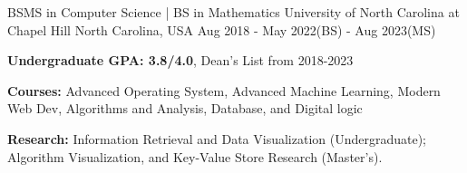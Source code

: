 

\begin{cventries}
\cventry
    {BSMS in Computer Science | BS in Mathematics} %
    {University of North Carolina at Chapel Hill} %
    {North Carolina, USA} %
    {Aug 2018 - May 2022(BS) - Aug 2023(MS)} %
    {
      \begin{cvitems} %
        \item {\textbf{Undergraduate GPA: 3.8/4.0}, Dean's List from 2018-2023}
        \item {\textbf{Courses:} Advanced Operating System, Advanced Machine Learning, Modern Web Dev, Algorithms and Analysis, Database, and Digital logic}
        \item {\textbf{Research:}  Information Retrieval and Data Visualization (Undergraduate); Algorithm Visualization, and Key-Value Store Research (Master's).}
      \end{cvitems}
    }

\end{cventries}
